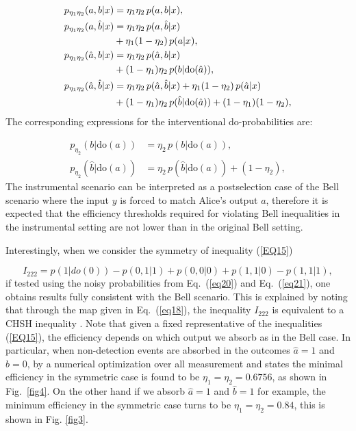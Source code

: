 \documentclass[aps,pra,reprint, superscriptaddress,showkeys]{revtex4-2}
\theoremstyle{plain}
\begin{document}
\begin{align}\label{eq20}
p_{\eta_1 \eta_2}(a,b|x) &= \eta_1 \eta_2 \, p(a,b|x), \\ \nonumber
p_{\eta_1 \eta_2}(a,\hat{b}|x) &= \eta_1 \eta_2 \, p(a,\hat{b}|x) \\ \nonumber & + \eta_1(1 - \eta_2) \, p(a|x), \\ \nonumber
p_{\eta_1 \eta_2}(\hat{a},b|x) &= \eta_1 \eta_2 \, p(\hat{a},b|x) \\ \nonumber & + (1 - \eta_1)\eta_2 \, p(b|\mathrm{do}(\hat{a})), \\ \nonumber
p_{\eta_1 \eta_2}(\hat{a},\hat{b}|x) &= \eta_1 \eta_2 \, p(\hat{a},\hat{b}|x) + \eta_1(1 - \eta_2) \, p(\hat{a}|x) \notag \\ \nonumber
\quad &+ (1 - \eta_1)\eta_2 \, p(\hat{b} | \mathrm{do}(\hat{a})) + (1 - \eta_1)(1 - \eta_2), \nonumber
\end{align}
The corresponding expressions for the interventional do-probabilities are:

\begin{align}\label{eq21}
p_{\eta_2}(b | \mathrm{do}(a)) &= \eta_2 \, p(b | \mathrm{do}(a)), \\ \nonumber
p_{\eta_2}(\hat{b} | \mathrm{do}(a)) &= \eta_2 \, p(\hat{b} | \mathrm{do}(a)) + (1 - \eta_2),
\end{align}
The instrumental scenario can be interpreted as a postselection case of the Bell scenario where the input \(y\) is forced to match Alice’s output \(a\), therefore it is expected that the efficiency thresholds required for violating Bell inequalities in the instrumental setting are not lower than in the original Bell setting.

Interestingly,  when we consider the symmetry of inequality (\ref{EQ15})

\begin{equation*}
    I_{222} =  p(1|do(0))-p(0, 1|1)+p(0, 0|0)+p(1, 1|0)-p(1, 1|1),
\end{equation*}
if tested using the noisy probabilities from Eq.~(\ref{eq20}) and Eq.~(\ref{eq21}), one obtains results fully consistent with the Bell scenario. This is explained by noting that through the map given in Eq.~(\ref{eq18}), the inequality $I_{222}$ is equivalent to a CHSH inequality \cite{ObsInt_Bell}. Note that given a fixed representative of the inequalities (\ref{EQ15}), the efficiency depends on which output we absorb as in the Bell case.  In particular, when non-detection events are absorbed in the outcomes \(\hat{a} = 1\) and \(\hat{b} = 0\), by a numerical optimization over all measurement and states the minimal efficiency in the symmetric case is found to be \(\eta_1 = \eta_2 = 0.6756\), as shown in Fig.~\ref{fig4}. On the other hand if we absorb  \(\hat{a} = 1\) and \(\hat{b} = 1\) for example, the minimum efficiency in the symmetric case turns to be \(\eta_1 = \eta_2 = 0.84\), this is shown in  Fig. \ref{fig3}.
\end{document}
